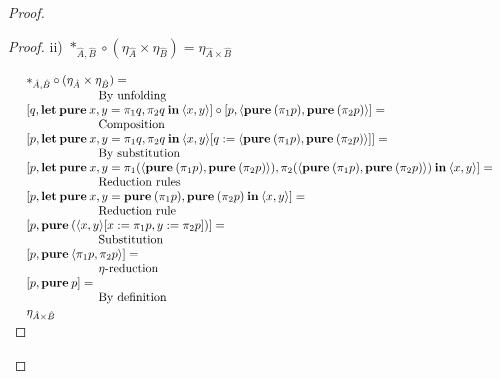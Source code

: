 \documentclass[a4paper]{article}
\begin{document}
\begin{proof}
\begin{proof}
\vspace{\baselineskip}

ii) $\ast_{\hat{A},\hat{B}} \circ (\eta_{\hat{A}} \times \eta_{\hat{B}}) = \eta_{\hat{A} \times \hat{B}}$

\vspace{\baselineskip}

$\begin{array}{lll}
& \ast_{\hat{A},\hat{B}} \circ (\eta_{\hat{A}} \times \eta_{\hat{B}}) = & \\
& \quad\quad\quad\quad\quad\quad \text{By unfolding} & \\
& [q, {\bf let \: pure \:} x, y = \pi_1 q, \pi_2 q {\: \bf in \:} \langle x, y \rangle] \circ [p, \langle {\bf pure \:} (\pi_1 p), {\bf pure \:} (\pi_2 p) \rangle] = & \\
& \quad\quad\quad\quad\quad\quad \text{Composition}& \\
& [p, {\bf let \: pure \:} x, y = \pi_1 q, \pi_2 q {\: \bf in \:} \langle x, y \rangle [q := \langle {\bf pure \:} (\pi_1 p), {\bf pure \:} (\pi_2 p) \rangle]] = & \\
& \quad\quad\quad\quad\quad\quad \text{By substitution}& \\
& [p, {\bf let \: pure \:} x, y = \pi_1 (\langle {\bf pure \:} (\pi_1 p), {\bf pure \:} (\pi_2 p) \rangle), \pi_2 (\langle {\bf pure \:} (\pi_1 p), {\bf pure \:} (\pi_2 p) \rangle) {\: \bf in \:} \langle x, y \rangle] = & \\
& \quad\quad\quad\quad\quad\quad \text{Reduction rules}& \\
& [p, {\bf let \: pure \:} x, y = {\bf pure \:} (\pi_1 p), {\bf pure \:} (\pi_2 p) {\: \bf in \:} \langle x, y \rangle] = & \\
& \quad\quad\quad\quad\quad\quad \text{Reduction rule}& \\
& [p, {\bf pure \:} (\langle x,y \rangle [x := \pi_1 p, y := \pi_2 p])] = & \\
& \quad\quad\quad\quad\quad\quad \text{Substitution}& \\
& [p, {\bf pure \:} \langle \pi_1 p, \pi_2 p \rangle] = & \\
& \quad\quad\quad\quad\quad\quad \text{$\eta$-reduction}& \\
& [p, {\bf pure \:} p] =& \\
& \quad\quad\quad\quad\quad\quad \text{By definition}& \\
& \eta_{\hat{A} \times \hat{B}}&
\end{array}$

\end{proof}


\end{proof}
\end{document}
